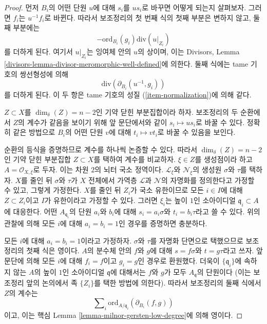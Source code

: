 \begin{proof}
먼저 $B_i$의 어떤 단원 $u$에 대해 $s_i$를 $us_i$로 바꾸면 어떻게
되는지 살펴보자. 그러면 $f_i$는 $u^{-1} f_i$로 바뀐다. 따라서
보조정리의 첫 번째 식의 첫째 부분은 변하지 않고, 둘째 부분에는
$$
-\text{ord}_{B_i}(g_i)\text{div}(u|_{Z_i})
$$
를 더하게 된다. 여기서 $u|_{Z_i}$는 잉여체 안의 $u$의 상이며, 이는
Divisors, Lemma \ref{divisors-lemma-divisor-meromorphic-well-defined}에
의한다. 둘째 식에는 tame 기호의 쌍선형성에 의해
$$
\text{div}(\partial_{B_i}(u^{-1}, g_i))
$$
를 더하게 된다. 이 두 항은 tame 기호의 성질
(\ref{item-normalization})에 의해 같다.

\medskip\noindent
$Z \subset X$를 $\dim_\delta(Z) = n - 2$인 기약 닫힌 부분집합이라 하자.
보조정리의 두 순환에서 $Z$의 계수가 같음을 보이기 위해 앞 문단에서와
같이 $s_i \mapsto us_i$로 바꿀 수 있다. 정확히 같은 방법으로 $B_i$의
어떤 단원 $v$에 대해 $t_i \mapsto vt_i$로 바꿀 수 있음을 보인다.

\medskip\noindent
순환의 등식을 증명하므로 계수를 하나씩 논증할 수 있다. 따라서
$\dim_\delta(Z) = n - 2$인 기약 닫힌 부분집합 $Z \subset X$를 택하여
계수를 비교하자. $\xi \in Z$를 생성점이라 하고
$A = \mathcal{O}_{X, \xi}$로 두자. 이는 차원 $2$의 뇌터 국소 정역이다.
$\mathcal{L}_\xi$와 $\mathcal{N}_\xi$의 생성원 $\sigma$와 $\tau$를
택하자. $X$를 줄인 뒤 $\sigma$와 $\tau$가 $X$ 전체에서 가역층
$\mathcal{L}$과 $\mathcal{N}$의 자명화를 정의한다고 가정할 수 있고,
그렇게 가정한다. $X$를 줄인 뒤 $Z_i$가 국소 유한이므로 모든
$i \in I$에 대해 $Z \subset Z_i$이고 $I$가 유한이라고 가정할 수 있다.
그러면 $\xi_i$는 높이 $1$인 소아이디얼
$\mathfrak q_i \subset A$에 대응한다. 어떤
$A_{\mathfrak q_i}$의 단원 $a_i$와 $b_i$에 대해
$s_i = a_i \sigma$와 $t_i = b_i \tau$라고 쓸 수 있다. 위의 관찰에
의해 모든 $i$에 대해 $a_i = b_i = 1$인 경우를 증명하면 충분하다.

\medskip\noindent
모든 $i$에 대해 $a_i = b_i = 1$이라고 가정하자. $\sigma$와 $\tau$를
자명화 단면으로 택했으므로 보조정리의 첫째 식은 영이다. $A$의 분수체
안의 $f$와 $g$에 대해 $s = f\sigma$와 $t = g \tau$라고 쓰자. 앞 문단에
의해 모든 $i$에 대해 $f_i = f$이고 $g_i = g$인 경우로 환원했다.
더욱이 $\{\mathfrak q_i\}$에 속하지 않는 $A$의 높이 $1$인 소아이디얼
$\mathfrak q$에 대해서는 $f$와 $g$가 모두 $A_\mathfrak q$의 단원이다
(이는 보조정리 앞의 논의에서 족 $\{Z_i\}$를 택한 방법에 의한다).
따라서 보조정리의 둘째 식에서 $Z$의 계수는
$$
\sum\nolimits_i \text{ord}_{A/\mathfrak q_i}(\partial_{B_i}(f, g))
$$
이고, 이는 핵심 Lemma \ref{lemma-milnor-gersten-low-degree}에 의해
영이다.
\end{proof}

